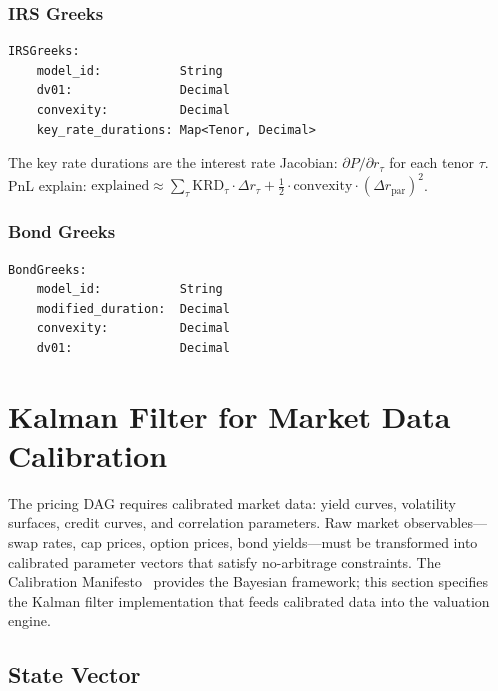 \documentclass[11pt,a4paper]{article}
\begin{document}
\subsubsection{IRS Greeks}
\begin{lstlisting}
IRSGreeks:
    model_id:           String
    dv01:               Decimal
    convexity:          Decimal
    key_rate_durations: Map<Tenor, Decimal>
\end{lstlisting}
The key rate durations are the interest rate Jacobian: $\partial P / \partial r_\tau$ for each tenor $\tau$.  PnL explain: $\text{explained} \approx \sum_\tau \mathrm{KRD}_\tau \cdot \Delta r_\tau + \frac{1}{2} \cdot \mathrm{convexity} \cdot (\Delta r_{\text{par}})^2$.

\subsubsection{Bond Greeks}
\begin{lstlisting}
BondGreeks:
    model_id:           String
    modified_duration:  Decimal
    convexity:          Decimal
    dv01:               Decimal
\end{lstlisting}

\clearpage
\section{Kalman Filter for Market Data Calibration}
\label{sec:calibration}

The pricing DAG requires calibrated market data: yield curves, volatility surfaces, credit curves, and correlation parameters.  Raw market observables---swap rates, cap prices, option prices, bond yields---must be transformed into calibrated parameter vectors that satisfy no-arbitrage constraints.  The Calibration Manifesto~\cite{calibration_manifesto} provides the Bayesian framework; this section specifies the Kalman filter implementation that feeds calibrated data into the valuation engine.

\subsection{State Vector}
\end{document}
